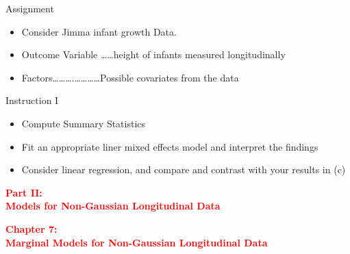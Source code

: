 \documentclass{beamer}
\begin{document}
\begin{frame}{Assignment}
\begin{itemize}
\item Consider Jimma infant growth Data.
\item Outcome Variable ……height of infants measured longitudinally
\item Factors……….…………Possible covariates from the data

\end{itemize}
\end{frame}


\begin{frame}{Instruction I}
\begin{itemize}
\item Compute Summary Statistics
\item Fit an appropriate liner mixed effects model and interpret the findings
\item Consider linear regression, and compare and contrast with  your results in (c)
\end{itemize}
\end{frame}

\begin{frame}
\centering
\Large
\textbf{\textcolor{red} {Part II:}}\\
\vspace*{3mm}
\textbf{\textcolor{red} {Models for Non-Gaussian Longitudinal Data}}
\end{frame}


\begin{frame}
\centering
\Large
\textbf{\textcolor{red} {Chapter 7:}}\\
\vspace*{3mm}
\textbf{\textcolor{red} {Marginal Models for Non-Gaussian Longitudinal Data}}
\end{frame}
\end{document}
